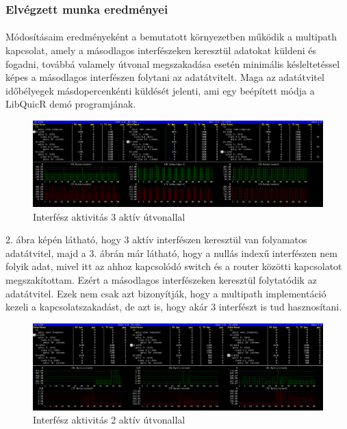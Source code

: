 \documentclass[a4paper,oneside]{article}
\begin{document}
\subsubsection{Elvégzett munka eredményei}
\paragraph{}

Módosításaim eredményeként a bemutatott környezetben működik a multipath
kapcsolat, amely a másodlagos interfészeken keresztül adatokat küldeni és fogadni, továbbá valamely útvonal megszakadása esetén
minimális késleltetéssel képes a másodlagos interfészen folytani az adatátvitelt.
Maga az adatátvitel időbélyegek másdopercenkénti küldését jelenti, ami egy beépített módja a LibQuicR demó programjának.

\begin{figure}[h]
  \centering
    \includegraphics[width=14cm]{bmon1}
\caption{Interfész aktivitás 3 aktív útvonallal}
\end{figure}

2. ábra képén látható, hogy 3 aktív interfészen keresztül van folyamatos adatátvitel, majd a 3. ábrán 
már látható, hogy a nullás indexű interfészen nem folyik adat, mivel itt az ahhoz kapcsolódó switch és a router közötti kapcsolatot megszakítottam.
Ezért a másodlagos interfészeken keresztül folytatódik az adatátvitel. Ezek nem csak azt bizonyítják, hogy a multipath 
implementáció kezeli a kapcsolatszakadást, de azt is, hogy akár 3 interfészt is tud hasznosítani.


\begin{figure}[h]
  \centering
    \includegraphics[width=14cm]{bmon2}
\caption{Interfész aktivitás 2 aktív útvonallal}
\end{figure}
\end{document}
